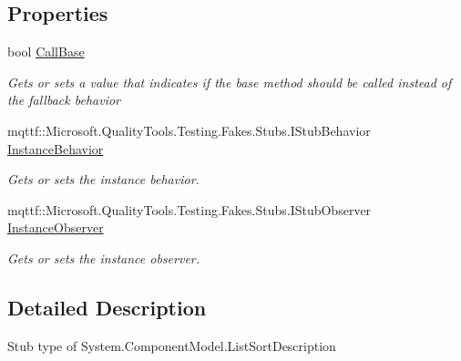 \subsection*{Properties}
\begin{DoxyCompactItemize}
\item 
bool \hyperlink{class_system_1_1_component_model_1_1_fakes_1_1_stub_list_sort_description_a5ade29f62eebc0513d3c7104b088b3c5}{Call\-Base}
\begin{DoxyCompactList}\small\item\em Gets or sets a value that indicates if the base method should be called instead of the fallback behavior\end{DoxyCompactList}\item 
mqttf\-::\-Microsoft.\-Quality\-Tools.\-Testing.\-Fakes.\-Stubs.\-I\-Stub\-Behavior \hyperlink{class_system_1_1_component_model_1_1_fakes_1_1_stub_list_sort_description_a7e8970c651791f386de3fa7354e79675}{Instance\-Behavior}
\begin{DoxyCompactList}\small\item\em Gets or sets the instance behavior.\end{DoxyCompactList}\item 
mqttf\-::\-Microsoft.\-Quality\-Tools.\-Testing.\-Fakes.\-Stubs.\-I\-Stub\-Observer \hyperlink{class_system_1_1_component_model_1_1_fakes_1_1_stub_list_sort_description_a3e3b7b7cffa63e5487b44775b31f9003}{Instance\-Observer}
\begin{DoxyCompactList}\small\item\em Gets or sets the instance observer.\end{DoxyCompactList}\end{DoxyCompactItemize}


\subsection{Detailed Description}
Stub type of System.\-Component\-Model.\-List\-Sort\-Description



